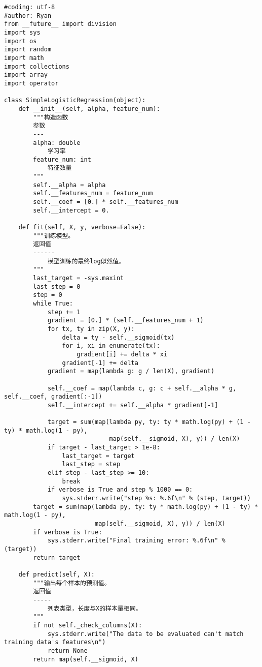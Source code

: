 \documentclass[10pt,a4paper]{ctexbook}
\begin{document}
\begin{verbatim}
#coding: utf-8
#author: Ryan
from __future__ import division
import sys
import os
import random
import math
import collections
import array
import operator

class SimpleLogisticRegression(object):
    def __init__(self, alpha, feature_num):
        """构造函数
        参数
        ---
        alpha: double
            学习率
        feature_num: int
            特征数量
        """
        self.__alpha = alpha
        self.__features_num = feature_num
        self.__coef = [0.] * self.__features_num
        self.__intercept = 0.

    def fit(self, X, y, verbose=False):
        """训练模型。
        返回值
        ------
            模型训练的最终log似然值。
        """
        last_target = -sys.maxint
        last_step = 0
        step = 0
        while True:
            step += 1
            gradient = [0.] * (self.__features_num + 1)
            for tx, ty in zip(X, y):
                delta = ty - self.__sigmoid(tx)
                for i, xi in enumerate(tx):
                    gradient[i] += delta * xi
                gradient[-1] += delta
            gradient = map(lambda g: g / len(X), gradient)

            self.__coef = map(lambda c, g: c + self.__alpha * g, self.__coef, gradient[:-1])
            self.__intercept += self.__alpha * gradient[-1]

            target = sum(map(lambda py, ty: ty * math.log(py) + (1 - ty) * math.log(1 - py),
                             map(self.__sigmoid, X), y)) / len(X)
            if target - last_target > 1e-8:
                last_target = target
                last_step = step
            elif step - last_step >= 10:
                break
            if verbose is True and step % 1000 == 0:
                sys.stderr.write("step %s: %.6f\n" % (step, target))
        target = sum(map(lambda py, ty: ty * math.log(py) + (1 - ty) * math.log(1 - py),
                         map(self.__sigmoid, X), y)) / len(X)
        if verbose is True:
            sys.stderr.write("Final training error: %.6f\n" % (target))
        return target

    def predict(self, X):
        """输出每个样本的预测值。
        返回值
        -----
            列表类型，长度与X的样本量相同。
        """
        if not self._check_columns(X):
            sys.stderr.write("The data to be evaluated can't match training data's features\n")
            return None
        return map(self.__sigmoid, X)


\end{verbatim}
\end{document}
